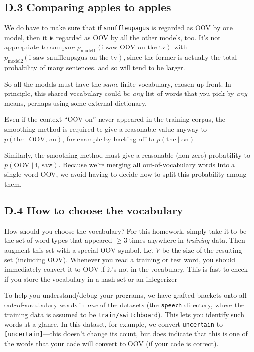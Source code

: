 \documentclass[12pt]{article}
\theoremstyle{plain}
\theoremstyle{definition}
\theoremstyle{remark}
\begin{document}
\subsection*{D.3 Comparing apples to apples}

We do have to make sure that if \texttt{snuffleupagus} is regarded as OOV by one model, then it is regarded as OOV by all the other models, too. It’s not appropriate to compare $p_{\text{model1}}(\text{i saw OOV on the tv})$ with $p_{\text{model2}}(\text{i saw snuffleupagus on the tv})$, since the former is actually the total probability of many sentences, and so will tend to be larger.

So all the models must have the \textit{same} finite vocabulary, chosen up front. In principle, this shared vocabulary could be \textit{any} list of words that you pick by \textit{any} means, perhaps using some external dictionary.

Even if the context “OOV on” never appeared in the training corpus, the smoothing method is required to give a reasonable value anyway to $p(\text{the} \mid \text{OOV, on})$, for example by backing off to $p(\text{the} \mid \text{on})$.

Similarly, the smoothing method must give a reasonable (non-zero) probability to $p(\text{OOV} \mid \text{i, saw})$. Because we’re merging all out-of-vocabulary words into a single word OOV, we avoid having to decide how to split this probability among them.

\subsection*{D.4 How to choose the vocabulary}

How should you choose the vocabulary? For this homework, simply take it to be the set of word types that appeared $\geq 3$ times anywhere in \textit{training} data. Then augment this set with a special OOV symbol. Let $V$ be the size of the resulting set (including OOV). Whenever you read a training or test word, you should immediately convert it to OOV if it’s not in the vocabulary. This is fast to check if you store the vocabulary in a hash set or an integerizer.

To help you understand/debug your programs, we have grafted brackets onto all out-of-vocabulary words in \textit{one} of the datasets (the \texttt{speech} directory, where the training data is assumed to be \texttt{train/switchboard}). This lets you identify such words at a glance. In this dataset, for example, we convert \texttt{uncertain} to \texttt{[uncertain]}—this doesn’t change its count, but does indicate that this is one of the words that your code will convert to OOV (if your code is correct).
\end{document}
